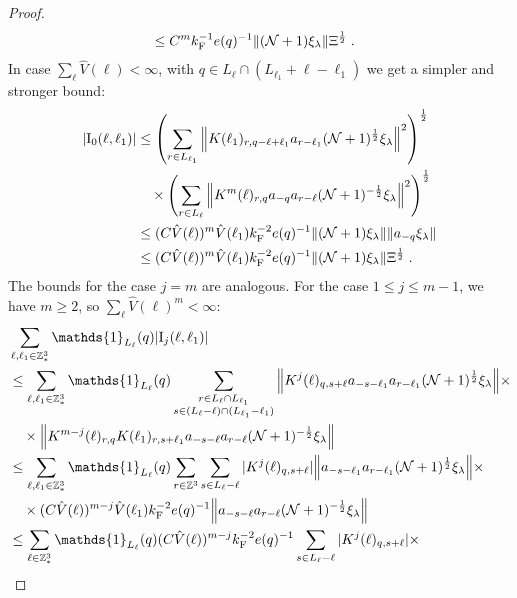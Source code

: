 \documentclass[12pt,a4paper]{article}
\numberwithin{equation}{section}
\newcommand{\1}{\mathbb{I}}
\newcommand{\F}{\mathrm{F}}
\newcommand{\I}{\mathrm{I}}
\newcommand{\Z}{\mathbb{Z}}
\newcommand{\NN}{\mathcal{N}}
\newcommand{\half}{\frac{1}{2}}
\theoremstyle{plain}
\theoremstyle{definition}
\theoremstyle{remark}
\theoremstyle{plain}
\theoremstyle{definition}
\theoremstyle{remark}
\begin{document}
\begin{proof}
\begin{align}
	&\leq C^m k_{\F}^{-1} e(q)^{-1}
		\norm{ (\NN+1) \xi_\lambda} \Xi^{\half} \;. \label{eq:estEQ2131_Coulomb}
\end{align}
In case $ \sum_\ell \hat{V}(\ell) < \infty $, with $ q \in L_\ell \cap (L_{\ell_1}+\ell-\ell_1) $ we get a simpler and stronger bound:
\begin{align}
	|\I_0(\ell, \ell_1)| 	&\leq \left(\sum_{r\in L_{\ell_1}} \norm{ K(\ell_1)_{r,q-\ell+\ell_1} a_{r-\ell_1}(\NN+1)^{\half} \xi_\lambda}^2\right)^\half \nonumber\\
	& \quad \times 	\left(\sum_{r\in L_{\ell}} \norm{ K^m(\ell)_{r,q} a_{-q}a_{r-\ell} (\NN+1)^{-\half} \xi_\lambda }^2 \right)^\half \nonumber\\
	&\leq (C \hat{V}(\ell))^m \hat{V}(\ell_1) k_{\F}^{-2} e(q)^{-1} \norm{ (\NN+1) \xi_\lambda} \norm{ a_{-q} \xi_\lambda } \nonumber \\
	&\leq (C \hat{V}(\ell))^m
		\hat{V}(\ell_1)
		k_{\F}^{-2} e(q)^{-1}
		\norm{ (\NN+1) \xi_\lambda} \Xi^{\half} \;. \label{eq:estEQ2131}
\end{align}
The bounds for the case $j=m$ are analogous. For the case $ 1 \le j \le m-1 $, we have $ m \ge 2 $, so $ \sum_\ell \hat{V}(\ell)^m < \infty $:
\begin{align}
	&\sum_{\ell,\ell_1 \in \Z^3_*} \mathds{1}_{L_\ell}(q) |\I_j(\ell, \ell_1)| \nonumber\\
	&\leq \sum_{\ell,\ell_1 \in \Z^3_*} \mathds{1}_{L_\ell}(q) \sum\limits_{\substack{r\in L_{\ell} \cap L_{\ell_1}\\ s \in (L_{\ell} - \ell) \cap (L_{\ell_1} - \ell_1)}}
		\norm{ K^{j}(\ell)_{q,s+\ell} a_{-s-\ell_1} a_{r-\ell_1} (\NN+1)^{\half} \xi_\lambda} \nonumber \times \\ 
	&\quad \times \norm{ K^{m-j}(\ell)_{r,q} K(\ell_1)_{r,s+\ell_1} a_{-s-\ell}a_{r-\ell} (\NN+1)^{-\half} \xi_\lambda } \nonumber\\
	&\leq \sum_{\ell,\ell_1 \in \Z^3_*} \mathds{1}_{L_\ell}(q)
		\sum_{r\in \Z^3} \sum_{s \in L_{\ell} - \ell}
		|K^{j}(\ell)_{q,s+\ell}|
		\norm{ a_{-s-\ell_1} a_{r-\ell_1} (\NN+1)^{\half} \xi_\lambda} \times \nonumber\\
	&\quad \times (C \hat{V}(\ell))^{m-j} \hat{V}(\ell_1) k_{\F}^{-2} e(q)^{-1}
		\norm{ a_{-s-\ell}a_{r-\ell} (\NN+1)^{-\half} \xi_\lambda } \nonumber\\
	&\leq \sum_{\ell \in \Z^3_*} \mathds{1}_{L_\ell}(q) (C \hat{V}(\ell))^{m-j} k_{\F}^{-2} e(q)^{-1}
		\sum_{s \in L_{\ell} - \ell}
		|K^{j}(\ell)_{q,s+\ell}| \times \nonumber\\

\end{align}
\end{proof}
\end{document}
